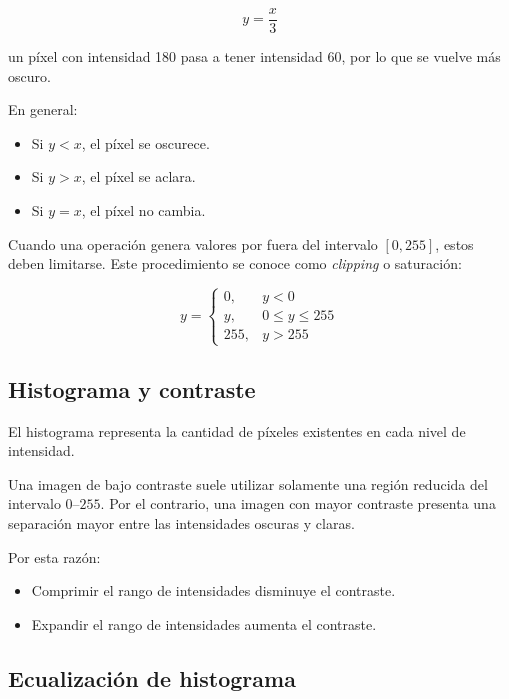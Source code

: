 \documentclass[11pt,letterpaper]{article}
\begin{document}
\begin{equation}
y=\frac{x}{3}
\end{equation}

un píxel con intensidad 180 pasa a tener intensidad 60, por lo que se vuelve más oscuro.

En general:

\begin{itemize}
    \item Si $y<x$, el píxel se oscurece.
    \item Si $y>x$, el píxel se aclara.
    \item Si $y=x$, el píxel no cambia.
\end{itemize}

Cuando una operación genera valores por fuera del intervalo $[0,255]$, estos deben limitarse. Este procedimiento se conoce como \textit{clipping} o saturación:

\begin{equation}
y=
\begin{cases}
0, & y<0\\
y, & 0\leq y\leq255\\
255, & y>255
\end{cases}
\end{equation}


\subsection{Histograma y contraste}

El histograma representa la cantidad de píxeles existentes en cada nivel de intensidad.

Una imagen de bajo contraste suele utilizar solamente una región reducida del intervalo $0$--$255$. Por el contrario, una imagen con mayor contraste presenta una separación mayor entre las intensidades oscuras y claras.

Por esta razón:

\begin{itemize}
    \item Comprimir el rango de intensidades disminuye el contraste.
    \item Expandir el rango de intensidades aumenta el contraste.
\end{itemize}


\subsection{Ecualización de histograma}
\end{document}

